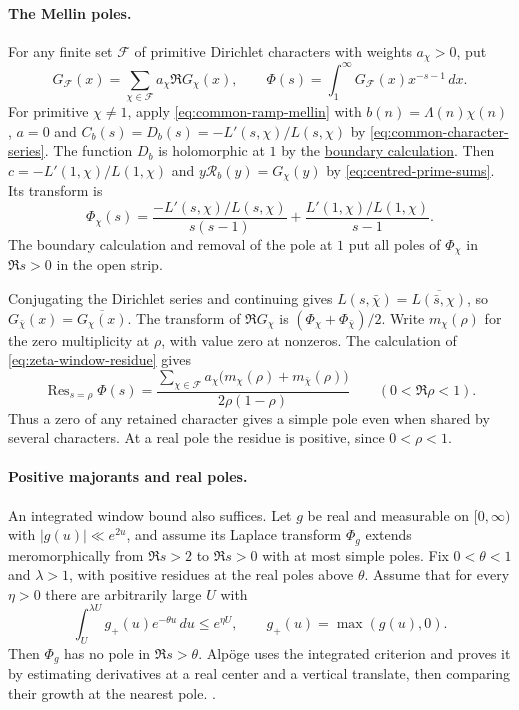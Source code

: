 \paragraph{The Mellin poles.}
For any finite set \(\mathcal F\) of primitive Dirichlet characters
with weights \(a_\chi>0\), put
\[
 G_{\mathcal F}(x)=\sum_{\chi\in\mathcal F}a_\chi\Re G_\chi(x),
 \qquad
 \Phi(s)=\int_1^\infty G_{\mathcal F}(x)x^{-s-1}\,dx .
\]
For primitive \(\chi\ne1\), apply \eqref{eq:common-ramp-mellin} with
\(b(n)=\Lambda(n)\chi(n)\), \(a=0\) and
\(C_b(s)=D_b(s)=-L'(s,\chi)/L(s,\chi)\) by
\eqref{eq:common-character-series}. The function \(D_b\) is holomorphic
at \(1\) by the \hyperlink{proof.dirichlet-zero-free-line}{boundary
calculation}. Then \(c=-L'(1,\chi)/L(1,\chi)\) and
\(y\mathcal R_b(y)=G_\chi(y)\) by \eqref{eq:centred-prime-sums}.
Its transform is
\[
 \Phi_\chi(s)=\frac{-L'(s,\chi)/L(s,\chi)}{s(s-1)}
                 +\frac{L'(1,\chi)/L(1,\chi)}{s-1}.
\]
The boundary calculation and removal of the pole at \(1\)
put all poles of \(\Phi_\chi\) in \(\Re s>0\) in the open strip.

Conjugating the Dirichlet series and continuing gives
\(L(s,\bar\chi)=\overline{L(\bar s,\chi)}\), so
\(G_{\bar\chi}(x)=\overline{G_\chi(x)}\). The transform of
\(\Re G_\chi\) is \((\Phi_\chi+\Phi_{\bar\chi})/2\).
Write \(m_\chi(\rho)\) for the zero multiplicity at \(\rho\),
with value zero at nonzeros. The calculation of
\eqref{eq:zeta-window-residue} gives
\[
 \operatorname{Res}_{s=\rho}\Phi(s)
 =\frac{\sum_{\chi\in\mathcal F}
        a_\chi\bigl(m_\chi(\rho)+m_{\bar\chi}(\rho)\bigr)}
        {2\rho(1-\rho)}
 \qquad(0<\Re\rho<1).
\]
Thus a zero of any retained character gives a simple pole even
when shared by several characters. At a real pole the residue is
positive, since \(0<\rho<1\).

\paragraph{Positive majorants and real poles.}
%
An integrated window bound also suffices. Let \(g\) be real and
measurable on \([0,\infty)\) with \(|g(u)|\ll e^{2u}\), and assume its
Laplace transform \(\Phi_g\) extends meromorphically from \(\Re s>2\)
to \(\Re s>0\) with at most simple poles. Fix \(0<\theta<1\) and
\(\lambda>1\), with positive residues at the real poles above \(\theta\).
Assume that for every \(\eta>0\) there are arbitrarily large \(U\) with
\begin{equation}
\label{eq:positive-majorant-window}
 \int_U^{\lambda U}g_+(u)e^{-\theta u}\,du\le e^{\eta U},
 \qquad g_+(u)=\max(g(u),0).
\end{equation}
Then \(\Phi_g\) has no pole in \(\Re s>\theta\).
Alp\"oge uses the integrated criterion and proves it by estimating
derivatives at a real center and a vertical translate, then comparing
their growth at the nearest pole.
.

